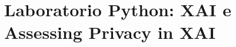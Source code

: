 \FloatBarrier
\section{Laboratorio Python: XAI e Assessing Privacy in XAI}
\label{ch:dm-lab-xai-privacy}

